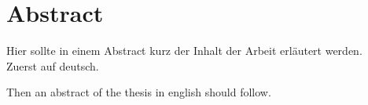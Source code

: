 \chapter*{Abstract} \label{kap:abstract}
Hier sollte in einem Abstract kurz der Inhalt der Arbeit erläutert werden. \\
Zuerst auf deutsch.
\bigskip

Then an abstract of the thesis in english should follow.